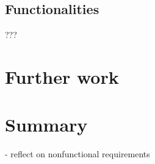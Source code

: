 \subsection{Functionalities}
???
\section{Further work}
\section{Summary}


- reflect on nonfunctional requirements